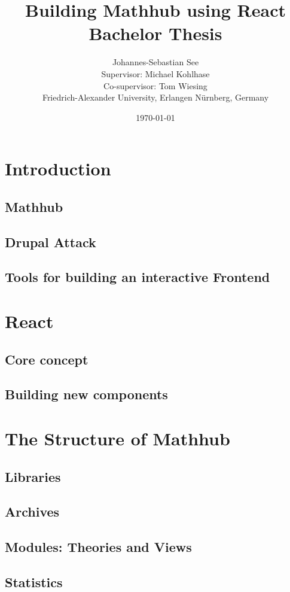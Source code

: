 \documentclass[11pt,a4paper]{article}
\title{Building Mathhub using React\\ \vspace{2 mm} Bachelor Thesis}
\author{Johannes-Sebastian See\\Supervisor: Michael Kohlhase\\Co-supervisor: Tom Wiesing\\Friedrich-Alexander University, Erlangen Nürnberg, Germany}
\date{\today}
\begin{document}
\begin{titlepage}
\maketitle
\end{titlepage}

\tableofcontents
\section{Introduction}
\subsection{Mathhub}
\subsection{Drupal Attack}
\subsection{Tools for building an interactive Frontend}

\section{React}
\subsection{Core concept}
\subsection{Building new components}

\section{The Structure of Mathhub}
\subsection{Libraries}
\subsection{Archives}
\subsection{Modules: Theories and Views}
\subsection{Statistics}
\end{document}
